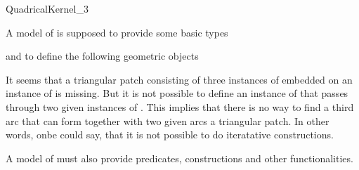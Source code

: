 \begin{ccRefConcept}{QuadricalKernel_3}

\ccRefines
{}


\ccTypes

A model of  is supposed to provide some basic types

\ccGlue
{}
\ccGlue
{}



and to define the following geometric objects

\ccGlue
{}
\ccGlue
{}
\ccGlue
{}

It seems that a triangular patch consisting of three instances of 
 embedded on an instance of  is missing. 
But it is not possible to define an instance of  that 
passes through two given instances of . This implies
that there is no way to find a third arc that can form together with two
given arcs a triangular patch. In other words, onbe could say, that 
it is not possible to do iteratative constructions.

A model of  must also provide predicates, 
constructions and other functionalities. 

\ccPredicates

\ccGlue
{}
\ccGlue
{}
\ccGlue
{}
\ccGlue
{}



\end{ccRefConcept}
